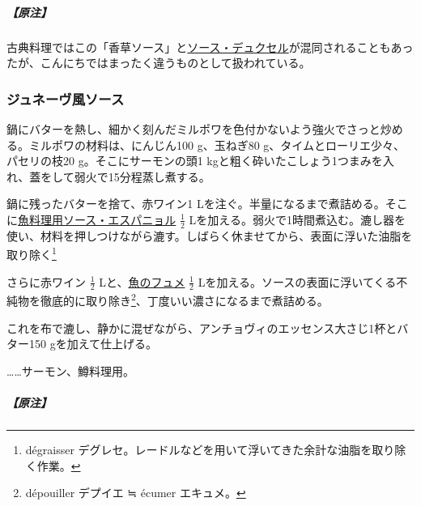 \begin{recette}
\hypertarget{nota-sauce-aux-fines-herbes}{%
\subparagraph{【原注】}\label{nota-sauce-aux-fines-herbes}}

古典料理ではこの「香草ソース」と\protect\hyperlink{sauce-duxelles}{ソース・デュクセル}が混同されることもあったが、こんにちではまったく違うものとして扱われている。

\atoaki{}

\hypertarget{sauce-genevoise}{%
\subsubsection{ジュネーヴ風ソース}\label{sauce-genevoise}}



鍋にバターを熱し、細かく刻んだミルポワを色付かないよう強火でさっと炒める。ミルポワの材料は、にんじん100
g、玉ねぎ80 g、タイムとローリエ少々、パセリの枝20 g。そこにサーモンの頭1
kgと粗く砕いたこしょう1つまみを入れ、蓋をして弱火で15分程蒸し煮する。

鍋に残ったバターを捨て、赤ワイン1
Lを注ぐ。半量になるまで煮詰める。そこに\protect\hyperlink{sauce-espagnole-maigre}{魚料理用ソース・エスパニョル}
\(\frac{1}{2}\)
Lを加える。弱火で1時間煮込む。漉し器を使い、材料を押しつけながら漉す。しばらく休ませてから、表面に浮いた油脂を取り除く\footnote{dégraisser
  デグレセ。レードルなどを用いて浮いてきた余計な油脂を取り除く作業。}

さらに赤ワイン \(\frac{1}{2}\)
Lと、\protect\hyperlink{fumet-de-poisson}{魚のフュメ} \(\frac{1}{2}\)
Lを加える。ソースの表面に浮いてくる不純物を徹底的に取り除き\footnote{dépouiller
  デプイエ ≒ écumer エキュメ。}、丁度いい濃さになるまで煮詰める。

これを布で漉し、静かに混ぜながら、アンチョヴィのエッセンス大さじ1杯とバター150
gを加えて仕上げる。

\ldots{}\ldots{}サーモン、鱒料理用。

\hypertarget{nota-sauce-genevoise}{%
\subparagraph{【原注】}\label{nota-sauce-genevoise}}


\end{recette}
